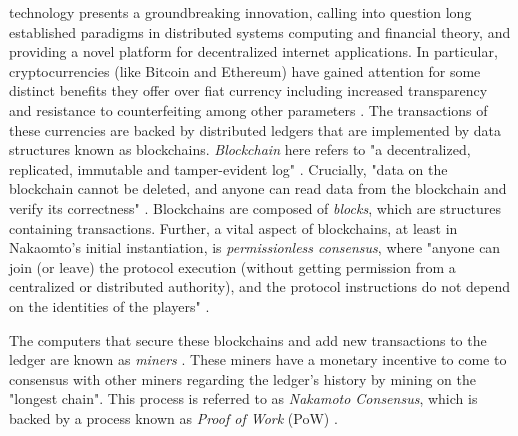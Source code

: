 \documentclass[10pt,journal,compsoc]{IEEEtran}
\begin{document}
% 
% 
% 
% 
 technology presents a groundbreaking innovation, calling into question long established paradigms in distributed systems computing and financial theory, and providing a novel platform for decentralized internet applications. In particular, cryptocurrencies (like Bitcoin and Ethereum) have gained attention for some distinct benefits they offer over fiat currency including increased transparency and resistance to counterfeiting among other parameters \cite{BitcoinFAQ}. The transactions of these currencies are backed by distributed ledgers that are implemented by data structures known as blockchains. \emph{Blockchain} here refers to "a decentralized, replicated, immutable and tamper-evident log" \cite{Bano}. Crucially, "data on the blockchain cannot be deleted, and anyone can read data from the blockchain and verify its correctness" \cite{Bano}. Blockchains are composed of \emph{blocks}, which are structures containing transactions. Further, a vital aspect of blockchains, at least in Nakaomto's initial instantiation, is \emph{permissionless consensus}, where "anyone can join (or leave) the protocol execution (without getting permission from a centralized or distributed authority), and the protocol instructions do not depend on the identities of the players" \cite{fruitchains}.

The computers that secure these blockchains and add new transactions to the ledger are known as \emph{miners} \cite{SatoshiWhitepaper}. These miners have a monetary incentive to come to consensus with other miners regarding the ledger's history by mining on the "longest chain". This process is referred to as \emph{Nakamoto Consensus}, which is backed by a process known as \emph{Proof of Work} (PoW) \cite{Bano}. 
\end{document}
